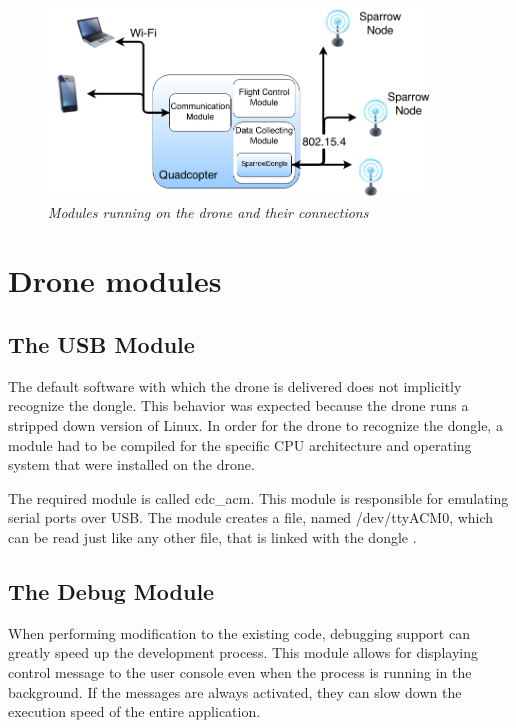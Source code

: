 \begin{figure}[ht]
\begin{center}
\includegraphics[width=0.9\textwidth]{img/organigrama.png}
\end{center}
\caption{\small \itshape{Modules running on the drone and their connections}}
  \label{fig:arhitecture}
\end{figure}

\section{Drone modules}

\subsection{The USB Module}

The default software with which the drone is delivered does not implicitly recognize the dongle. This behavior was expected because the drone runs a stripped down version of Linux. In order for the drone to recognize the dongle, a module had to be compiled for the specific CPU architecture and operating system that were installed on the drone.

The required module is called cdc\_acm\cite{cdcacm}. This module is responsible for emulating serial ports over USB. The module creates a file, named /dev/ttyACM0, which can be read just like any other file, that is linked with the dongle .

\subsection{The Debug Module}
 
When performing modification to the existing code, debugging support can greatly speed up the development process. This module allows for displaying control message to the user console even when the process is running in the background. If the messages are always activated, they can slow down the execution speed of the entire application.


